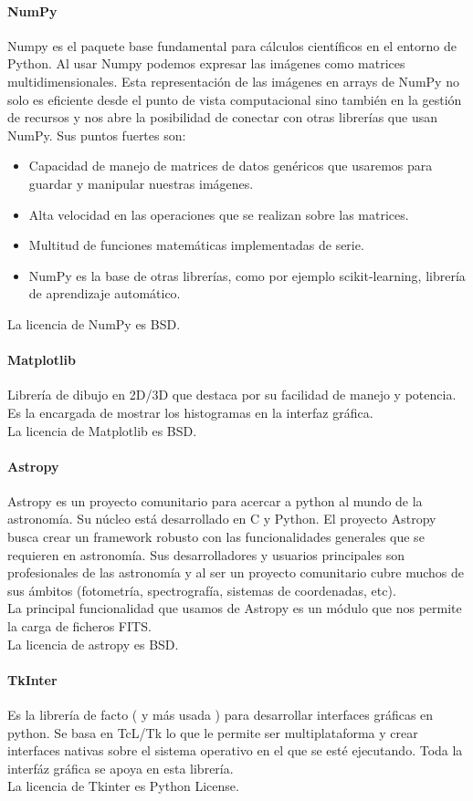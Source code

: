 	\paragraph{NumPy}
	Numpy es el paquete base fundamental para cálculos científicos en el entorno de Python. Al usar Numpy podemos expresar las imágenes como matrices multidimensionales. Esta representación de las imágenes en arrays de NumPy no solo es eficiente desde el punto de vista computacional sino también en la gestión de recursos y nos abre la posibilidad de conectar con otras librerías que usan NumPy. Sus puntos fuertes son:
	\begin{itemize}
		\item Capacidad de manejo de matrices de datos genéricos que usaremos para guardar y manipular nuestras imágenes.
		\item Alta velocidad en las operaciones que se realizan sobre las matrices.
		\item Multitud de funciones matemáticas implementadas de serie.
		\item NumPy es la base de otras librerías, como por ejemplo scikit-learning, librería de aprendizaje automático.
	\end{itemize}
	La licencia de NumPy es BSD.
	\paragraph{Matplotlib}
	Librería de dibujo en 2D/3D que destaca por su facilidad de manejo y potencia. Es la encargada de mostrar los histogramas en la interfaz gráfica.\\
	La licencia de Matplotlib es BSD.
	\paragraph{Astropy}
	Astropy es un proyecto comunitario para acercar a python al mundo de la astronomía. Su núcleo está desarrollado en C y Python. El proyecto Astropy busca crear un framework robusto con las funcionalidades generales que se requieren en astronomía. Sus desarrolladores y usuarios principales son profesionales de las astronomía y al ser un proyecto comunitario cubre muchos de sus ámbitos (fotometría, spectrografía, sistemas de coordenadas, etc).\\
	La principal funcionalidad que usamos de Astropy es un módulo que nos permite la carga de ficheros FITS.\\
	La licencia de astropy es BSD.\\
	\paragraph{TkInter}
	Es la librería de facto ( y más usada ) para desarrollar interfaces gráficas en python. Se basa en TcL/Tk lo que le permite ser multiplataforma y crear interfaces nativas sobre el sistema operativo en el que se esté ejecutando. Toda la interfáz gráfica se apoya en esta librería.\\	
	La licencia de Tkinter es Python License.
	\vfill
	\newpage
